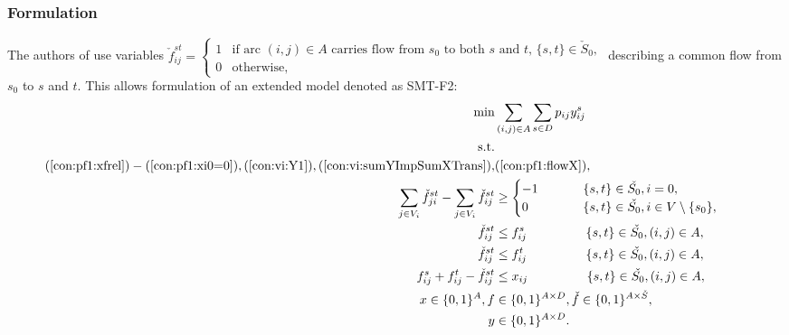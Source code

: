 \subsubsection{Formulation}
The authors of \cite{Polzin} use variables
\newline\newline  
  $\check{f}^{st}_{ij}=
	\begin{cases}
    1 & \text{if arc $(i,j) \in A$ carries flow from $s_0$ to both $s$ and $t$, $\{s,t\}\in \check{S}_0$},\\
    0 & \text{otherwise},
  \end{cases}$
  \newline\newline  
  describing a common flow from $s_0$ to $s$ and $t$. This allows formulation of an extended model denoted as SMT-F2: 
    \begin{subequations}
    \begin{flalign}
  \min &  \sum\limits_{(i,j) \in A} \sum\limits_{s \in D} p_{ij} y^s_{ij}    \\  \notag  
		   \text{s.t.}&                  && \\			   
		   (\ref{con:pf1:xfrel}) - (\ref{con:pf1:xi0=0}), (\ref{con:vi:Y1}),(\ref{con:vi:sumYImpSumXTrans}),&(\ref{con:pf1:flowX}),& \notag \\ 	
\label{con:pf2:flowHook}  \sum\limits_{\substack{ j \in V_i }}\check{f}^{st}_{ji}-\sum\limits_{\substack{j\in V_i}}\check{f}^{st}_{ij}    & \geq \begin{cases}
    -1~~~&  \{s,t\}\in \check{S_0}, i = 0, \\        0  ~~~~   \qquad         & \{s,t\}\in \check{S_0}, i\in V\setminus \{s_0\},\end{cases}     \\			
\label{con:pf2:startInSource}  \check{f}^{st}_{ij}    & \leq f^s_{ij}~~   \qquad  \qquad \{s,t\}\in \check{S_0}, (i,j)\in A, \\	
\label{con:pf2:stopInDest}  \check{f}^{st}_{ij}    & \leq f^t_{ij}~~   \qquad    \qquad \{s,t\}\in \check{S_0}, (i,j)\in A, \\			 		
 \label{con:pf2:stronger}  f^{s}_{ij}+f^{t}_{ij}-\check{f}^{st}_{ij}    &\leq x_{ij}    ~~ \qquad \qquad  \{s,t\}\in \check{S_0}, (i,j)\in A, \\			 	   			  
 \label{con:pf2:dim}  x     \in \{0,1\}^A,  f&\in \{0,1\}^{A\times D}, \check{f}\in\{0,1\}^{A\times \check{S}},\\
 \label{con:pf2:dim2}  y & \in \{0,1\}^{A\times D}.
    \end{flalign}~
    \end{subequations}

